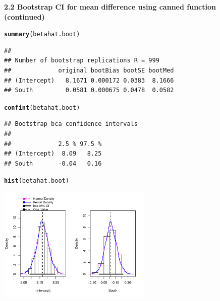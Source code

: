 \documentclass[10pt]{beamer}\usepackage[]{graphicx}\usepackage[]{color}
\makeatletter
\newcommand{\hlstd}[1]{\textcolor[rgb]{0.345,0.345,0.345}{#1}}%
\newcommand{\hlkwd}[1]{\textcolor[rgb]{0.737,0.353,0.396}{\textbf{#1}}}%
\newenvironment{kframe}{%
 \def\at@end@of@kframe{}%
 \ifinner\ifhmode%
  \def\at@end@of@kframe{\end{minipage}}%
  \begin{minipage}{\columnwidth}%
 \fi\fi%
 \def\FrameCommand##1{\hskip\@totalleftmargin \hskip-\fboxsep
 \colorbox{shadecolor}{##1}\hskip-\fboxsep
     \hskip-\linewidth \hskip-\@totalleftmargin \hskip\columnwidth}%
 \MakeFramed {\advance\hsize-\width
   \@totalleftmargin\z@ \linewidth\hsize
   \@setminipage}}%
 {\par\unskip\endMakeFramed%
 \at@end@of@kframe}
\newenvironment{knitrout}{}{} %
\makeatother
\begin{document}
\begin{frame}[fragile,plain]
	\small
	\textbf{2.2 Bootstrap CI for mean difference using canned function (continued)}
\begin{knitrout}\tiny
{}\color{fgcolor}\begin{kframe}
\begin{alltt}
\hlkwd{summary}\hlstd{(betahat.boot)}
\end{alltt}
\begin{verbatim}
## 
## Number of bootstrap replications R = 999 
##             original bootBias bootSE bootMed
## (Intercept)   8.1671 0.000172 0.0383  8.1666
## South         0.0581 0.000675 0.0478  0.0582
\end{verbatim}
\begin{alltt}
\hlkwd{confint}\hlstd{(betahat.boot)}
\end{alltt}
\begin{verbatim}
## Bootstrap bca confidence intervals
## 
##             2.5 % 97.5 %
## (Intercept)  8.09   8.25
## South       -0.04   0.16
\end{verbatim}
\begin{alltt}
\hlkwd{hist}\hlstd{(betahat.boot)}
\end{alltt}
\end{kframe}

{\centering \includegraphics[width=0.55\textwidth]{figure/unnamed-chunk-25-1} 

}



\end{knitrout}
	
\end{frame}
\end{document}
